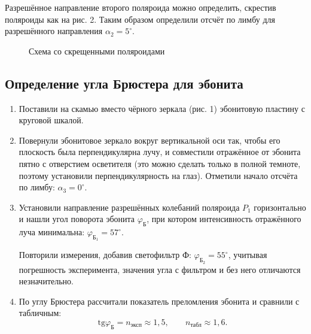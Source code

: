 \documentclass[a4paper,12pt]{article}
\begin{document}
\begin{enumerate}
				
		Разрешённое направление второго поляроида можно определить, скрестив поляроиды как на рис. 2. Таким образом определили отсчёт по лимбу для разрешённого направления $\alpha_2=5^\circ$.
		\begin{figure}
		\centering
		    \caption{Схема со скрещенными поляроидами}
		\end{figure}
		
	\end{enumerate}
	\subsection*{Определение угла Брюстера для эбонита}
	\begin{enumerate}
		\item Поставили на скамью вместо чёрного зеркала (рис. 1) эбонитовую пластину с круговой шкалой.
		
		\item Повернули эбонитовое зеркало вокруг вертикальной оси так, чтобы его плоскость была перпендикулярна лучу, и совместили отражённое от эбонита пятно с отверстием осветителя (это можно сделать только в полной темноте, поэтому установили перпендикулярность на глаз). Отметили начало отсчёта по лимбу: $\alpha_3=0^\circ$.
		
		\item Установили направление разрешённых колебаний поляроида $P_1$  горизонтально и нашли угол поворота эбонита $\varphi_\text{Б}$, при котором интенсивность отражённого луча минимальна: $\varphi_\text{Б$_1$}=57^\circ$.
		
		Повторили измерения, добавив светофильтр Ф: $\varphi_\text{Б$_2$}=55^\circ$, учитывая погрешность эксперимента, значения угла с фильтром и без него отличаются незначительно.
		
		\item По углу Брюстера рассчитали показатель преломления эбонита и сравнили с табличным:
		\begin{equation*}
		    \text{tg}\varphi_\text{Б}=n_\text{эксп}\approx 1{,}5,\;\;\;\;\;\;\;n_\text{табл}\approx 1{,}6.
		\end{equation*}
	\end{enumerate}
\end{document}
